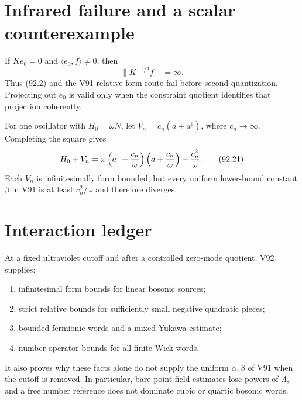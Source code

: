 \documentclass[11pt]{article}
\theoremstyle{remark}
\begin{document}
\section{Infrared failure and a scalar counterexample}

\begin{counterexample}
\label{cnt:v15v92-ir}
If \(Ke_0=0\) and \(\langle e_0,f\rangle\ne0\), then
\[
 \|K^{-1/2}f\|=\infty.                                \tag{92.20}
\]
Thus (92.2) and the V91 relative-form route fail before second
quantization.  Projecting out \(e_0\) is valid only when the
constraint quotient identifies that projection coherently.
\end{counterexample}

\begin{counterexample}
\label{cnt:v15v92-linear-source}
For one oscillator with \(H_0=\omega N\), let
\(V_n=c_n(a+a^\dagger)\), where \(c_n\to\infty\).  Completing the
square gives
\[
 H_0+V_n
 =\omega\left(a^\dagger+{c_n\over\omega}\right)
          \left(a+{c_n\over\omega}\right)
   -{c_n^2\over\omega}.                               \tag{92.21}
\]
Each \(V_n\) is infinitesimally form bounded, but every uniform
lower-bound constant \(\beta\) in V91 is at least
\(c_n^2/\omega\) and therefore diverges.
\end{counterexample}

\section{Interaction ledger}

At a fixed ultraviolet cutoff and after a controlled zero-mode
quotient, V92 supplies:
\begin{enumerate}
\item infinitesimal form bounds for linear bosonic sources;
\item strict relative bounds for sufficiently small negative
      quadratic pieces;
\item bounded fermionic words and a mixed Yukawa estimate;
\item number-operator bounds for all finite Wick words.
\end{enumerate}
It also proves why these facts alone do not supply the uniform
\(\alpha,\beta\) of V91 when the cutoff is removed.  In particular,
bare point-field estimates lose powers of \(\Lambda\), and a free
number reference does not dominate cubic or quartic bosonic words.
\end{document}
